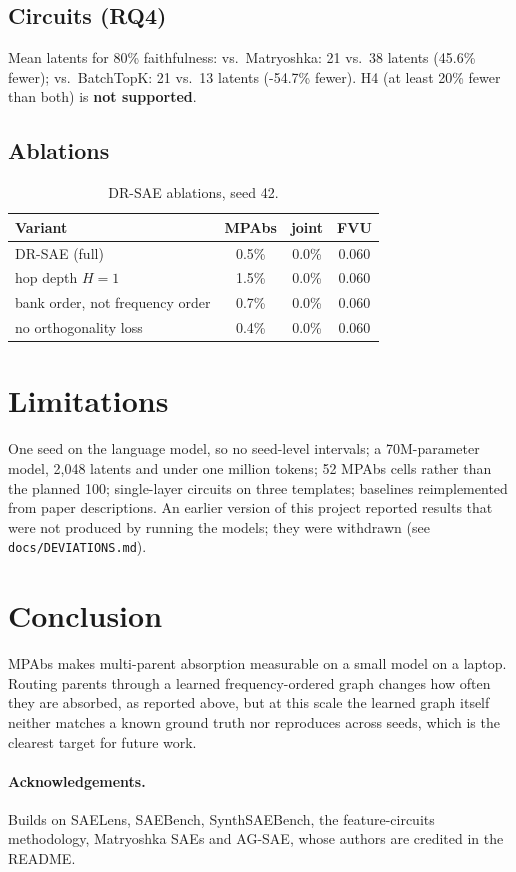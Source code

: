 \documentclass[10pt]{article}
\begin{document}
\subsection{Circuits (RQ4)}
Mean latents for 80\% faithfulness: vs.\ Matryoshka: 21 vs.\ 38 latents (45.6\% fewer); vs.\ BatchTopK: 21 vs.\ 13 latents (-54.7\% fewer). H4 (at least 20\% fewer than both) is \textbf{not supported}.

\subsection{Ablations}
\begin{table}[h]\centering\small
\begin{tabular}{lccc}\toprule
Variant & MPAbs & joint & FVU \\\midrule
DR-SAE (full) & 0.5\% & 0.0\% & 0.060 \\
hop depth $H = 1$ & 1.5\% & 0.0\% & 0.060 \\
bank order, not frequency order & 0.7\% & 0.0\% & 0.060 \\
no orthogonality loss & 0.4\% & 0.0\% & 0.060 \\
\bottomrule\end{tabular}
\caption{DR-SAE ablations, seed 42.}
\end{table}

\section{Limitations}
One seed on the language model, so no seed-level intervals; a 70M-parameter model, 2{,}048 latents and under one million tokens; 52 MPAbs cells rather than the planned 100; single-layer circuits on three templates; baselines reimplemented from paper descriptions. An earlier version of this project reported results that were not produced by running the models; they were withdrawn (see \texttt{docs/DEVIATIONS.md}).

\section{Conclusion}
MPAbs makes multi-parent absorption measurable on a small model on a laptop. Routing parents through a learned frequency-ordered graph changes how often they are absorbed, as reported above, but at this scale the learned graph itself neither matches a known ground truth nor reproduces across seeds, which is the clearest target for future work.

\paragraph{Acknowledgements.} Builds on SAELens, SAEBench, SynthSAEBench, the feature-circuits methodology, Matryoshka SAEs and AG-SAE, whose authors are credited in the README.
\end{document}
